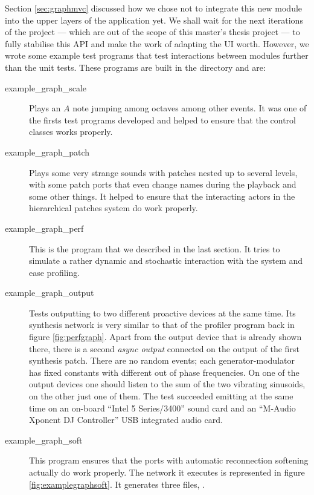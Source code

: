 Section \ref{sec:graphmvc} discussed how we chose not to integrate
this new module into the upper layers of the application yet. We shall
wait for the next iterations of the project --- which are out of the
scope of this master's thesis project --- to fully stabilise this API
and make the work of adapting the UI worth. However, we wrote some
example test programs that test interactions between modules further
than the unit tests. These programs are built in the 
directory and are:
\begin{description}
\item[example\_graph\_scale] Plays an $A$ note jumping among octaves
  among other events. It was one of the firsts test programs developed
  and helped to ensure that the control classes works properly.

\item[example\_graph\_patch] Plays some very strange sounds with
  patches nested up to several levels, with some patch ports that even
  change names during the playback and some other things. It helped to
  ensure that the interacting actors in the hierarchical patches
  system do work properly.

\item[example\_graph\_perf] This is the program that we described in
  the last section. It tries to simulate a rather dynamic and
  stochastic interaction with the system and ease profiling.

\item[example\_graph\_output] Tests outputting to two different
  proactive devices at the same time. Its synthesis network is very
  similar to that of the profiler program back in figure
  \ref{fig:perfgraph}. Apart from the output device that is already
  shown there, there is a second \emph{async output} connected on the
  output of the first synthesis patch. There are no random events;
  each generator-modulator has fixed constants with different out of
  phase frequencies. On one of the output devices one should listen to
  the sum of the two vibrating sinusoids, on the other just one of
  them. The test succeeded emitting at the same time on an on-board
  ``Intel 5 Series/3400'' sound card and an ``M-Audio Xponent DJ
  Controller'' USB integrated audio card.

\item[example\_graph\_soft] This program ensures that the ports with
  automatic reconnection softening actually do work properly. The
  network it executes is represented in figure
  \ref{fig:examplegraphsoft}. It generates three files,
  . 


\end{description}
